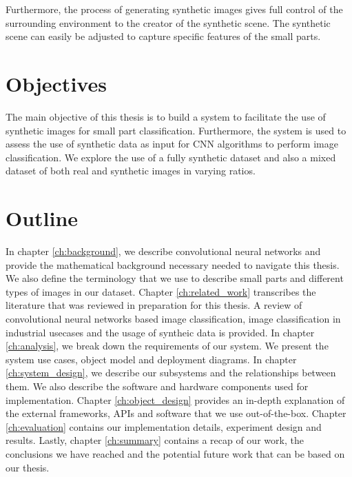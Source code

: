 Furthermore, the process of generating synthetic images gives full control of the surrounding environment to the creator of the synthetic scene. The synthetic scene can easily be adjusted to capture specific features of the small parts.

\section{Objectives}

The main objective of this thesis is to build a system to facilitate the use of synthetic images for small part classification. Furthermore, the system is used to assess the use of synthetic data as input for CNN algorithms to perform image classification. We explore the use of a fully synthetic dataset and also a mixed dataset of both real and synthetic images in varying ratios.

\section{Outline}
In chapter \ref{ch:background}, we describe convolutional neural networks and provide the mathematical background necessary needed to navigate this thesis. We also define the terminology that we use to describe small parts and different types of images in our dataset. Chapter \ref{ch:related_work} transcribes the literature that was reviewed in preparation for this thesis. A review of convolutional neural networks based image classification, image classification in industrial usecases and the usage of syntheic data is provided. In chapter \ref{ch:analysis}, we break down the requirements of our system. We present the system use cases, object model and deployment diagrams. In chapter \ref{ch:system_design}, we describe our subsystems and the relationships between them. We also describe the software and hardware components used for implementation. Chapter \ref{ch:object_design} provides an in-depth explanation of the external frameworks, APIs and software that we use out-of-the-box. Chapter \ref{ch:evaluation} contains our implementation details, experiment design and results. Lastly, chapter \ref{ch:summary} contains a recap of our work, the conclusions we have reached and the potential future work that can be based on our thesis.






